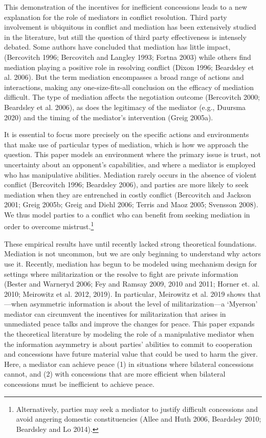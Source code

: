 \documentclass[12pt, letterpaper]{article}
\begin{document}
This demonstration of the incentives for inefficient concessions leads to a new explanation for the role of mediators in conflict resolution. Third party involvement is ubiquitous in conflict and mediation has been extensively studied in the literature, but still the question of third party effectiveness is intensely debated.  Some authors have concluded that mediation has little impact, (Bercovitch 1996;  Bercovitch and Langley 1993; Fortna 2003) while others find mediation playing a positive role in resolving conflict (Dixon 1996; Beardsley et al. 2006).  But the term mediation encompasses a broad range of actions and interactions, making any one-size-fits-all conclusion on the efficacy of mediation difficult. The type of mediation affects the negotiation outcome (Bercovitch 2000; Beardsley et al. 2006), as does the legitimacy of the mediator (e.g., Duursma 2020) and the timing of the mediator's intervention (Greig 2005a).

It is essential to focus more precisely on the specific actions and environments that make use of particular types of mediation, which is how we approach the question. This paper models an environment where the primary issue is trust, not uncertainty about an opponent's capabilities, and where a mediator is employed who has manipulative abilities. Mediation rarely occurs in the absence of violent conflict (Bercovitch 1996; Beardsley 2006), and parties are more likely to seek mediation when they are entrenched in costly conflict (Bercovitch and Jackson 2001; Greig 2005b; Greig and Diehl 2006; Terris and Maoz 2005; Svensson 2008). We thus model parties to a conflict who can benefit from seeking mediation in order to overcome mistrust.\footnote{Alternatively, parties may seek a mediator to justify difficult concessions and avoid angering domestic constituencies (Allee and Huth 2006, Beardsley 2010; Beardsley and Lo 2014).}

These empirical results have until recently lacked strong theoretical foundations. Mediation is not uncommon, but we are only beginning to understand why actors use it. Recently, mediation has begun to be modeled using mechanism design for settings where militarization or the resolve to fight are private information (Bester and Warneryd 2006; Fey and Ramsay 2009, 2010 and 2011; Horner et. al. 2010; Meirowitz et al. 2012, 2019). In particular, Meirowitz et al. 2019 shows that---when asymmetric information is about the level of militarization---a `Myerson' mediator can circumvent the incentives for militarization that arises in unmediated peace talks and improve the changes for peace. This paper expands the theoretical literature by modeling the role of a manipulative mediator when the information asymmetry is about parties' abilities to commit to cooperation and concessions have future material value that could be used to harm the giver. Here, a mediator can achieve peace (1) in situations where bilateral concessions cannot, and (2) with concessions that are more efficient when bilateral concessions must be inefficient to achieve peace. 
\end{document}
